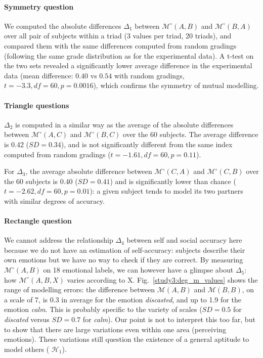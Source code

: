 \documentclass[natbib]{svjour3}
\newcommand{\gmodel}[2]{{$\mathcal{M}(#1, #2)$}}
\newcommand{\Model}[3]{{$\mathcal{M}^{\circ}(#1, #2, #3)$}}
\newcommand{\gModel}[2]{{$\mathcal{M}^{\circ}(#1, #2)$}}
\begin{document}
\paragraph{Symmetry question} We computed the absolute differences $\Delta_1$
between \gModel{A}{B} and \gModel{B}{A} over all pair of subjects within a triad
(3 values per triad, 20 triads), and compared them with the same differences
computed from random gradings (following the same grade distribution as for the
experimental data). A t-test on the two sets revealed a significantly lower average difference in
the experimental data (mean difference: $0.40$ vs $0.54$ with random gradings,
$t=-3.3, df=60, p = 0.0016$), which confirms the symmetry of mutual modelling.

\paragraph{Triangle questions} $\Delta_2$ is computed in a similar way as the average of
the absolute differences between \gModel{A}{C} and \gModel{B}{C} over the 60
subjects. The average difference is 0.42 ($SD= 0.34$), and is not significantly
different from the same index computed from random gradings ($t=-1.61, df=60,
p=0.11$).

For $\Delta_3$, the average absolute difference between \gModel{C}{A} and
\gModel{C}{B} over the 60 subjects is 0.40 ($SD= 0.41$) and is significantly
lower than chance ($t=-2.62, df=60, p=0.01$): a given subject tends to model its
two partners with similar degrees of accuracy.


\paragraph{Rectangle question} We cannot address the relationship $\Delta_4$
between self and social accuracy here because we do not have an estimation of
self-accuracy: subjects describe their own emotions but we have no way to check if
they are correct. By measuring \gModel{A}{B} on  18 emotional labels,
we can however have a glimpse about $\Delta_5$: how \Model{A}{B}{X} varies
according to X.  Fig.~\ref{study3:deg_m_values} shows the range of modelling
errors: the difference between \gmodel{A}{B} and \gmodel{B}{B}, on a scale of 7,
is 0.3 in average for the emotion \emph{discasted}, and up to 1.9 for the
emotion \emph{calm}. This is probably specific to the variety of scales  ($SD=
0.5$ for \emph{discated} versus $SD=0.7$ for \emph{calm}). Our point is not to
interpret this too far, but to show that there are large variations even within one
area  (perceiving emotions). These variations still question the existence of
a general aptitude to model others ( $\mathcal{H}_{1}$).
\end{document}
